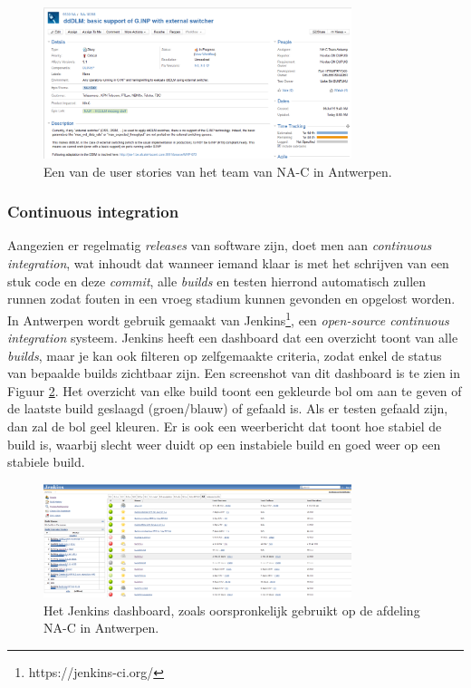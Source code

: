 \documentclass[10pt,a4paper]{article}
\begin{document}
\begin{figure}[ht!]
\centering
\includegraphics[width=90mm]{user_story.png}
\caption{Een van de user stories van het team van NA-C in Antwerpen.} 
\label{user_story}
\end{figure}

\subsubsection{Continuous integration}
Aangezien er regelmatig \textit{releases} van software zijn, doet men aan \textit{continuous integration}, wat inhoudt dat wanneer iemand klaar is met het schrijven van een stuk code en deze \textit{commit}, alle \textit{builds} en testen hierrond automatisch zullen runnen zodat fouten in een vroeg stadium kunnen gevonden en opgelost worden.\\
In Antwerpen wordt gebruik gemaakt van Jenkins\footnote{https://jenkins-ci.org/}, een \textit{open-source continuous integration} systeem. Jenkins heeft een dashboard dat een overzicht toont van alle \textit{builds}, maar je kan ook filteren op zelfgemaakte criteria, zodat enkel de status van bepaalde builds zichtbaar zijn. Een screenshot van dit dashboard is te zien in Figuur \ref{jenkins_orig}. Het overzicht van elke build toont een gekleurde bol om aan te geven of de laatste build geslaagd (groen/blauw) of gefaald is. Als er testen gefaald zijn, dan zal de bol geel kleuren.
Er is ook een weerbericht dat toont hoe stabiel de build is, waarbij slecht weer duidt op een instabiele build en goed weer op een stabiele build. 

\begin{figure}[ht!]
\centering
\includegraphics[width=90mm]{CaptureJenkins.png}
\caption{Het Jenkins dashboard, zoals oorspronkelijk gebruikt op de afdeling NA-C in Antwerpen.} 
\label{jenkins_orig}
\end{figure}
\end{document}
